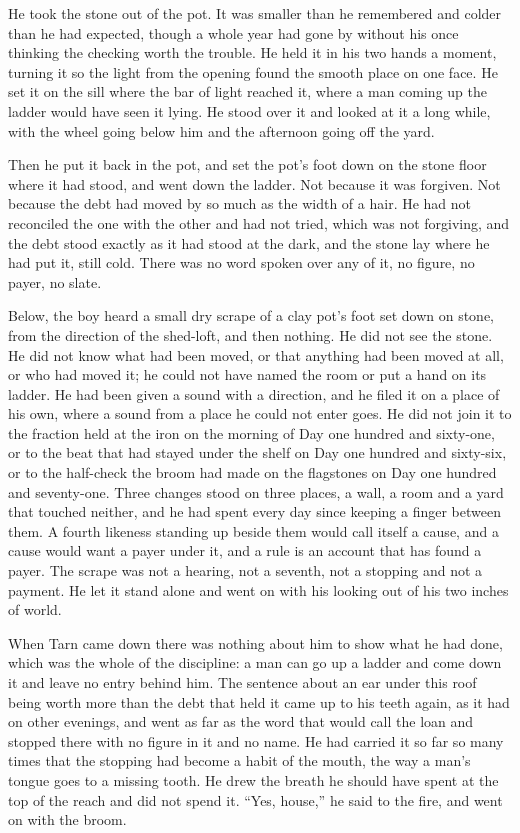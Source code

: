 He took the stone out of the pot. It was smaller than he remembered and colder than he had expected, though a whole year had gone by without his once thinking the checking worth the trouble. He held it in his two hands a moment, turning it so the light from the opening found the smooth place on one face. He set it on the sill where the bar of light reached it, where a man coming up the ladder would have seen it lying. He stood over it and looked at it a long while, with the wheel going below him and the afternoon going off the yard.

Then he put it back in the pot, and set the pot's foot down on the stone floor where it had stood, and went down the ladder. Not because it was forgiven. Not because the debt had moved by so much as the width of a hair. He had not reconciled the one with the other and had not tried, which was not forgiving, and the debt stood exactly as it had stood at the dark, and the stone lay where he had put it, still cold. There was no word spoken over any of it, no figure, no payer, no slate.

Below, the boy heard a small dry scrape of a clay pot's foot set down on stone, from the direction of the shed-loft, and then nothing. He did not see the stone. He did not know what had been moved, or that anything had been moved at all, or who had moved it; he could not have named the room or put a hand on its ladder. He had been given a sound with a direction, and he filed it on a place of his own, where a sound from a place he could not enter goes. He did not join it to the fraction held at the iron on the morning of Day one hundred and sixty-one, or to the beat that had stayed under the shelf on Day one hundred and sixty-six, or to the half-check the broom had made on the flagstones on Day one hundred and seventy-one. Three changes stood on three places, a wall, a room and a yard that touched neither, and he had spent every day since keeping a finger between them. A fourth likeness standing up beside them would call itself a cause, and a cause would want a payer under it, and a rule is an account that has found a payer. The scrape was not a hearing, not a seventh, not a stopping and not a payment. He let it stand alone and went on with his looking out of his two inches of world.

\scenebreak

When Tarn came down there was nothing about him to show what he had done, which was the whole of the discipline: a man can go up a ladder and come down it and leave no entry behind him. The sentence about an ear under this roof being worth more than the debt that held it came up to his teeth again, as it had on other evenings, and went as far as the word that would call the loan and stopped there with no figure in it and no name. He had carried it so far so many times that the stopping had become a habit of the mouth, the way a man's tongue goes to a missing tooth. He drew the breath he should have spent at the top of the reach and did not spend it. “Yes, house,” he said to the fire, and went on with the broom.

